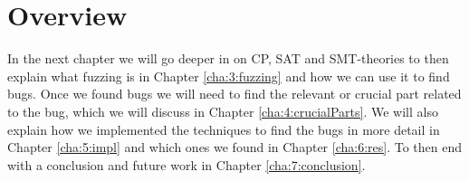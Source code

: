 \section{Overview}
In the next chapter we will go deeper in on CP, SAT and SMT-theories to then explain what fuzzing is in Chapter \ref{cha:3:fuzzing} and how we can use it to find bugs. Once we found bugs we will need to find the relevant or crucial part related to the bug, which we will discuss in Chapter \ref{cha:4:crucialParts}. We will also explain how we implemented the techniques to find the bugs in more detail in Chapter \ref{cha:5:impl} and which ones we found in Chapter \ref{cha:6:res}. To then end with a conclusion and future work in Chapter \ref{cha:7:conclusion}.


